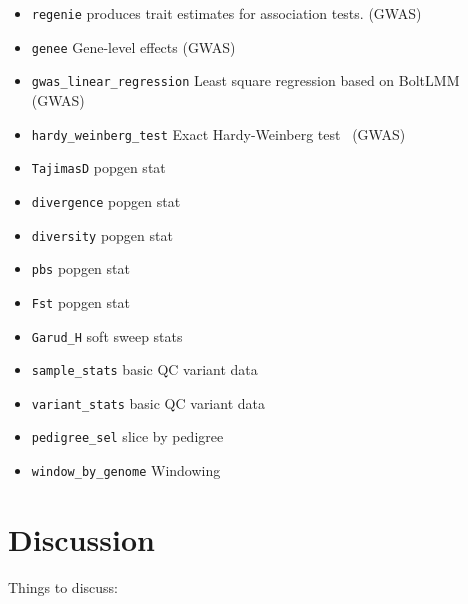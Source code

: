 \documentclass[9pt,lineno]{elife}
\newcommand{\sgapi}[1]{\texttt{#1}}
\begin{document}
\begin{itemize}
\item \sgapi{regenie} produces trait estimates for association tests.
\citep{mbatchou2021computationally} (GWAS)
\item \sgapi{genee} Gene-level effects
\citep{cheng2020estimation} (GWAS)
\item \sgapi{gwas\_linear\_regression} Least square regression based
on BoltLMM~\citep{loh2015efficient} (GWAS)
\item \sgapi{hardy\_weinberg\_test} Exact Hardy-Weinberg
test~\citep{wigginton2005note} (GWAS)

\item \sgapi{TajimasD} popgen stat
\item \sgapi{divergence} popgen stat
\item \sgapi{diversity} popgen stat
\item \sgapi{pbs} popgen stat
\item \sgapi{Fst} popgen stat
\item \sgapi{Garud\_H} soft sweep stats~\citep{garud2015recent}


\item \sgapi{sample\_stats} basic QC variant data

\item \sgapi{variant\_stats} basic QC variant data

\item \sgapi{pedigree\_sel} slice by pedigree

\item \sgapi{window\_by\_genome} Windowing

\end{itemize}





\section{Discussion}

Things to discuss:
\end{document}
